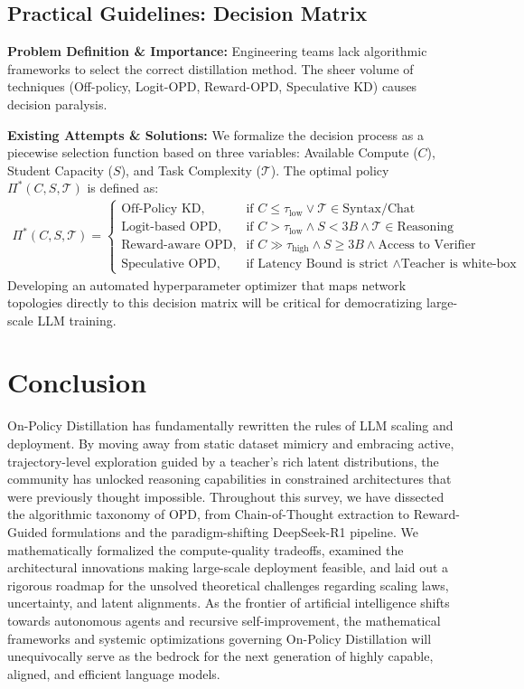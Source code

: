 \documentclass{article} %
\begin{document}
\subsection{Practical Guidelines: Decision Matrix}
\textbf{Problem Definition \& Importance:} Engineering teams lack algorithmic frameworks to select the correct distillation method. The sheer volume of techniques (Off-policy, Logit-OPD, Reward-OPD, Speculative KD) causes decision paralysis.

\textbf{Existing Attempts \& Solutions:} We formalize the decision process as a piecewise selection function based on three variables: Available Compute ($C$), Student Capacity ($S$), and Task Complexity ($\mathcal{T}$). The optimal policy $\Pi^*(C, S, \mathcal{T})$ is defined as:
\begin{align}
\Pi^*(C, S, \mathcal{T}) = 
\begin{cases} 
\text{Off-Policy KD}, & \text{if } C \le \tau_{\text{low}} \lor \mathcal{T} \in \text{Syntax/Chat} \\
\text{Logit-based OPD}, & \text{if } C > \tau_{\text{low}} \land S < 3B \land \mathcal{T} \in \text{Reasoning} \\
\text{Reward-aware OPD}, & \text{if } C \gg \tau_{\text{high}} \land S \ge 3B \land \text{Access to Verifier} \\
\text{Speculative OPD}, & \text{if Latency Bound is strict } \land \text{Teacher is white-box}
\end{cases}
\end{align}
Developing an automated hyperparameter optimizer that maps network topologies directly to this decision matrix will be critical for democratizing large-scale LLM training.

\section{Conclusion}
\label{sec:conclusion}
On-Policy Distillation has fundamentally rewritten the rules of LLM scaling and deployment. By moving away from static dataset mimicry and embracing active, trajectory-level exploration guided by a teacher's rich latent distributions, the community has unlocked reasoning capabilities in constrained architectures that were previously thought impossible. Throughout this survey, we have dissected the algorithmic taxonomy of OPD, from Chain-of-Thought extraction to Reward-Guided formulations and the paradigm-shifting DeepSeek-R1 pipeline. We mathematically formalized the compute-quality tradeoffs, examined the architectural innovations making large-scale deployment feasible, and laid out a rigorous roadmap for the unsolved theoretical challenges regarding scaling laws, uncertainty, and latent alignments. As the frontier of artificial intelligence shifts towards autonomous agents and recursive self-improvement, the mathematical frameworks and systemic optimizations governing On-Policy Distillation will unequivocally serve as the bedrock for the next generation of highly capable, aligned, and efficient language models.
\end{document}
